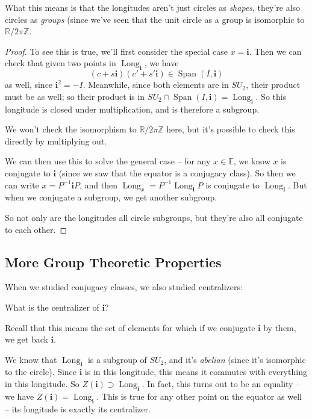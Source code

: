 What this means is that the longitudes aren't just circles as \emph{shapes}, they're also circles as \emph{groups} (since we've seen that the unit circle as a group is isomorphic to $\mathbb{R}/2\pi\mathbb{Z}$. 
\begin{proof}
To see this is true, we'll first consider the special case $x = \mathbf{i}$. Then we can check that given two points in $\operatorname{Long}_{\mathbf{i}}$, we have \[(c + s\mathbf{i})(c' + s'\mathbf{i}) \in \operatorname{Span}(I, \mathbf{i})\] as well, since $\mathbf{i}^2 = -I$. Meanwhile, since both elements are in $SU_2$, their product must be as well; so their product is in $SU_2 \cap \operatorname{Span}(I, \mathbf{i}) = \operatorname{Long}_{\mathbf{i}}$. So this longitude is closed under multiplication, and is therefore a subgroup. 

We won't check the isomorphism to $\mathbb{R}/2\pi\mathbb{Z}$ here, but it's possible to check this directly by multiplying out.

We can then use this to solve the general case -- for any $x \in \mathbb{E}$, we know $x$ is conjugate to $\mathbf{i}$ (since we saw that the equator is a conjugacy class). So then we can write $x = P^{-1}\mathbf{i}P$, and then $\operatorname{Long}_x = P^{-1}\operatorname{Long}_{\mathbf{i}}P$ is conjugate to $\operatorname{Long}_{\mathbf{i}}$. But when we conjugate a subgroup, we get another subgroup. 

So not only are the longitudes all circle subgroups, but they're also all conjugate to each other. 
\end{proof}

\subsection{More Group Theoretic Properties}

When we studied conjugacy classes, we also studied centralizers:

\begin{qq}
What is the centralizer of $\mathbf{i}$?
\end{qq}

Recall that this means the set of elements for which if we conjugate $\mathbf{i}$ by them, we get back $\mathbf{i}$. 

We know that $\operatorname{Long}_{\mathbf{i}}$ is a subgroup of $SU_2$, and it's \emph{abelian} (since it's isomorphic to the circle). Since $\mathbf{i}$ is in this longitude, this means it commutes with everything in this longitude. So $Z(\mathbf{i}) \supset \operatorname{Long}_{\mathbf{i}}$. In fact, this turns out to be an equality -- we have $Z(\mathbf{i}) = \operatorname{Long}_{\mathbf{i}}$. This is true for any other point on the equator as well -- its longitude is exactly its centralizer. 

